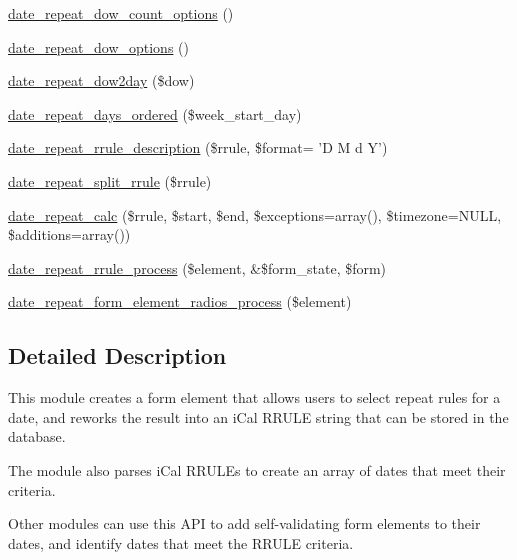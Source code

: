 \begin{DoxyCompactItemize}
\item 
\hyperlink{date__repeat_8module_a6477b176fba9dd394ca159f555267cb1}{date\_\-repeat\_\-dow\_\-count\_\-options} ()
\item 
\hyperlink{date__repeat_8module_a0db2cd4cff89bce5add79b4e73a10535}{date\_\-repeat\_\-dow\_\-options} ()
\item 
\hyperlink{date__repeat_8module_a405d111dc6063ab1a16b0a43e3dbe604}{date\_\-repeat\_\-dow2day} (\$dow)
\item 
\hyperlink{date__repeat_8module_af210c31340e410884987c375118cd263}{date\_\-repeat\_\-days\_\-ordered} (\$week\_\-start\_\-day)
\item 
\hyperlink{date__repeat_8module_acaa5064a19a194c235a3616198da2071}{date\_\-repeat\_\-rrule\_\-description} (\$rrule, \$format= 'D M d Y')
\item 
\hyperlink{date__repeat_8module_a4f7e5ba566b1e66abea72ccce5efcb64}{date\_\-repeat\_\-split\_\-rrule} (\$rrule)
\item 
\hyperlink{date__repeat_8module_a3d79ef2b99159e6f7bf47560e0fd40f9}{date\_\-repeat\_\-calc} (\$rrule, \$start, \$end, \$exceptions=array(), \$timezone=NULL, \$additions=array())
\item 
\hyperlink{date__repeat_8module_a45198dc27e593ee47661fc205a3e8d31}{date\_\-repeat\_\-rrule\_\-process} (\$element, \&\$form\_\-state, \$form)
\item 
\hyperlink{date__repeat_8module_a8cfb8bcf609bee5a14b40fd7b6d918d1}{date\_\-repeat\_\-form\_\-element\_\-radios\_\-process} (\$element)
\end{DoxyCompactItemize}


\subsection{Detailed Description}
This module creates a form element that allows users to select repeat rules for a date, and reworks the result into an iCal RRULE string that can be stored in the database.

The module also parses iCal RRULEs to create an array of dates that meet their criteria.

Other modules can use this API to add self-\/validating form elements to their dates, and identify dates that meet the RRULE criteria. 

